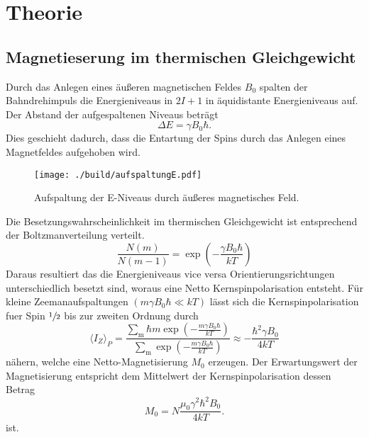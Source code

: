 \section{Theorie}%
\label{sec:theorie}
\subsection{Magnetieserung im thermischen Gleichgewicht}%
\label{ssub:magnetieserung_im_thermischen_gleichgewicht}
Durch das Anlegen eines äußeren magnetischen Feldes $B_0$ spalten der Bahndrehimpuls die Energieniveaus in $2 I
+ 1$ in äquidistante Energieniveaus auf. 
Der Abstand der aufgespaltenen Niveaus beträgt 
\begin{equation}
		\label{eq:delta_e}
		\Delta E = \gamma B_0 \hbar. 
\end{equation}
Dies geschieht dadurch, dass die Entartung der Spins durch das Anlegen eines
Magnetfeldes aufgehoben wird.
\begin{figure}[ht]
		\centering
		\texttt{[image: ./build/aufspaltungE.pdf]}
		\caption{Aufspaltung der E-Niveaus durch äußeres magnetisches Feld.}
		\label{fig:aufsp_E}
\end{figure}
Die Besetzungswahrscheinlichkeit im thermischen Gleichgewicht ist entsprechend
der Boltzmanverteilung verteilt.
\begin{equation}
		\label{eq:boltzmann}
		\frac{N(m)}{N(m-1)} = \exp \left( - \frac{\gamma B_0 \hbar}{kT} \right)
\end{equation}
Daraus resultiert das die Energieniveaus vice versa Orientierungsrichtungen unterschiedlich
besetzt sind, woraus eine Netto Kernspinpolarisation entsteht. 
Für kleine Zeemanaufspaltungen $(m \gamma B_0 \hbar \ll kT)$ lässt sich die
Kernspinpolarisation fuer Spin $\sfrac{1}{2}$ bis zur
zweiten Ordnung durch
\begin{equation}
		\label{eq:kernpo}
		\langle I_Z \rangle_P = \frac{\sum_\text{m} \hbar m \exp\left(-\frac{m \gamma B_0
		\hbar}{kT}\right)}{\sum_\text{m}\exp\left(-\frac{m \gamma B_0
		\hbar}{kT}\right)} \approx - \frac{\hbar^2 \gamma B_0}{4 kT}
\end{equation}
nähern, welche eine Netto-Magnetisierung $M_0$ erzeugen. 
Der Erwartungswert der Magnetisierung entspricht dem Mittelwert der
Kernspinpolarisation dessen Betrag 
\begin{equation}
		\label{eq:magn}
		M_0 = N \frac{\mu_0 \gamma^2 \hbar^2 B_0}{4 kT} .
\end{equation}
ist.

